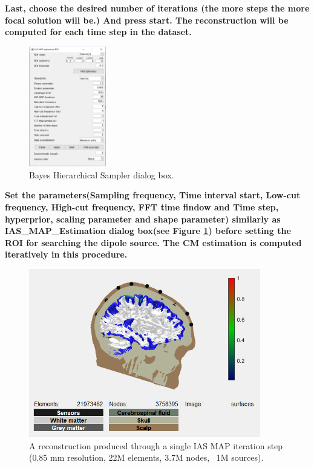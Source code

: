 \documentclass[5p]{elsarticle}
\begin{document}
\begin{frontmatter}
\bf Last, choose the desired number of iterations (the more steps the more focal solution will be.) And press start. The reconstruction will be computed for each time step in the dataset.
 

\begin{figure}[h!]
  \begin{center}
    \includegraphics[width=0.3\textwidth]{Hierarchical Bayesian Sampler.png}
  \end{center}
  \caption{Bayes Hierarchical Sampler dialog box.}
  \label{fig_7}
\end{figure}

\bf Set the parameters(Sampling frequency, Time interval start, Low-cut frequency, High-cut frequency, FFT time findow and Time step, hyperprior, scaling parameter and shape parameter) similarly as IAS_MAP_Estimation dialog box(see Figure \ref{fig_7}) before setting the ROI for searching the dipole source. The CM estimation is computed iteratively in this procedure.


\begin{figure}[h!]
  \begin{center}
    \includegraphics[width=0.9\textwidth]{capture.png}
  \end{center}
  \caption{A reconstruction produced through a single IAS MAP iteration step (0.85 mm resolution, 22M elements, 3.7M nodes, ~1M sources).}
  \label{fig_8}
\end{figure}


\end{frontmatter}
\end{document}
